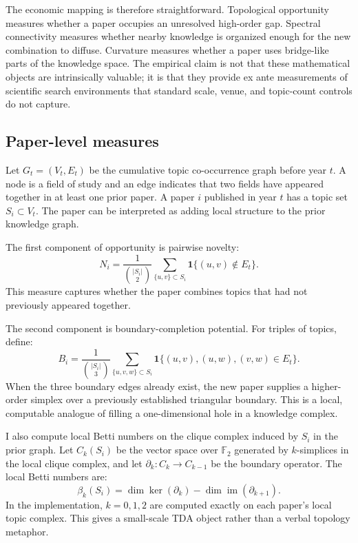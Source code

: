 \documentclass[preprint,12pt,authoryear]{elsarticle}
\begin{document}
The economic mapping is therefore straightforward. Topological opportunity measures whether a paper occupies an unresolved high-order gap. Spectral connectivity measures whether nearby knowledge is organized enough for the new combination to diffuse. Curvature measures whether a paper uses bridge-like parts of the knowledge space. The empirical claim is not that these mathematical objects are intrinsically valuable; it is that they provide ex ante measurements of scientific search environments that standard scale, venue, and topic-count controls do not capture.

\subsection{Paper-level measures}

Let $G_t=(V_t,E_t)$ be the cumulative topic co-occurrence graph before year $t$. A node is a field of study and an edge indicates that two fields have appeared together in at least one prior paper. A paper $i$ published in year $t$ has a topic set $S_i \subset V_t$. The paper can be interpreted as adding local structure to the prior knowledge graph.

The first component of opportunity is pairwise novelty:
\begin{equation}
N_i = \frac{1}{\binom{|S_i|}{2}}\sum_{\{u,v\}\subset S_i}\mathbf{1}\{(u,v)\notin E_t\}.
\end{equation}
This measure captures whether the paper combines topics that had not previously appeared together.

The second component is boundary-completion potential. For triples of topics, define:
\begin{equation}
B_i =
\frac{1}{\binom{|S_i|}{3}}
\sum_{\{u,v,w\}\subset S_i}
\mathbf{1}\{(u,v),(u,w),(v,w)\in E_t\}.
\end{equation}
When the three boundary edges already exist, the new paper supplies a higher-order simplex over a previously established triangular boundary. This is a local, computable analogue of filling a one-dimensional hole in a knowledge complex.

I also compute local Betti numbers on the clique complex induced by $S_i$ in the prior graph. Let $C_k(S_i)$ be the vector space over $\mathbb{F}_2$ generated by $k$-simplices in the local clique complex, and let $\partial_k:C_k\rightarrow C_{k-1}$ be the boundary operator. The local Betti numbers are:
\begin{equation}
\beta_k(S_i) = \dim \ker(\partial_k) - \dim \operatorname{im}(\partial_{k+1}).
\end{equation}
In the implementation, $k=0,1,2$ are computed exactly on each paper's local topic complex. This gives a small-scale TDA object rather than a verbal topology metaphor.
\end{document}
